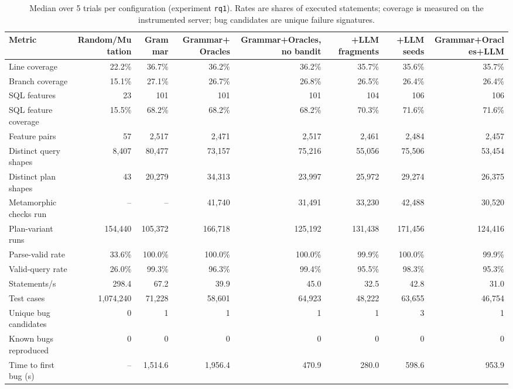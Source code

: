 \begin{table}[t]
  \caption{Median over 5 trials per configuration (experiment \texttt{rq1}). Rates are shares of executed statements; coverage is measured on the instrumented server; bug candidates are unique failure signatures.}
  \label{tab:rq1-summary}
  \footnotesize
  \begin{tabular}{lrrrrrrr}
    \toprule
    Metric & Random/Mutation & Grammar & Grammar+Oracles & Grammar+Oracles, no bandit & +LLM fragments & +LLM seeds & Grammar+Oracles+LLM \\
    \midrule
    Line coverage & 22.2\% & 36.7\% & 36.2\% & 36.2\% & 35.7\% & 35.6\% & 35.7\% \\
    Branch coverage & 15.1\% & 27.1\% & 26.7\% & 26.8\% & 26.5\% & 26.4\% & 26.4\% \\
    SQL features & 23 & 101 & 101 & 101 & 104 & 106 & 106 \\
    SQL feature coverage & 15.5\% & 68.2\% & 68.2\% & 68.2\% & 70.3\% & 71.6\% & 71.6\% \\
    Feature pairs & 57 & 2{,}517 & 2{,}471 & 2{,}517 & 2{,}461 & 2{,}484 & 2{,}457 \\
    Distinct query shapes & 8{,}407 & 80{,}477 & 73{,}157 & 75{,}216 & 55{,}056 & 75{,}506 & 53{,}454 \\
    Distinct plan shapes & 43 & 20{,}279 & 34{,}313 & 23{,}997 & 25{,}972 & 29{,}274 & 26{,}375 \\
    Metamorphic checks run & -- & -- & 41{,}740 & 31{,}491 & 33{,}230 & 42{,}488 & 30{,}520 \\
    Plan-variant runs & 154{,}440 & 105{,}372 & 166{,}718 & 125{,}192 & 131{,}438 & 171{,}456 & 124{,}416 \\
    Parse-valid rate & 33.6\% & 100.0\% & 100.0\% & 100.0\% & 99.9\% & 100.0\% & 99.9\% \\
    Valid-query rate & 26.0\% & 99.3\% & 96.3\% & 99.4\% & 95.5\% & 98.3\% & 95.3\% \\
    Statements/s & 298.4 & 67.2 & 39.9 & 45.0 & 32.5 & 42.8 & 31.0 \\
    Test cases & 1{,}074{,}240 & 71{,}228 & 58{,}601 & 64{,}923 & 48{,}222 & 63{,}655 & 46{,}754 \\
    Unique bug candidates & 0 & 1 & 1 & 1 & 1 & 3 & 1 \\
    Known bugs reproduced & 0 & 0 & 0 & 0 & 0 & 0 & 0 \\
    Time to first bug (s) & -- & 1{,}514.6 & 1{,}956.4 & 470.9 & 280.0 & 598.6 & 953.9 \\
    \bottomrule
  \end{tabular}
\end{table}
